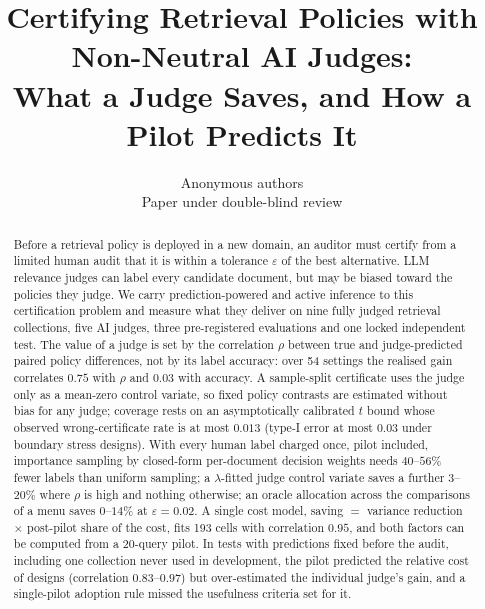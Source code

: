 \documentclass{article}
\title{Certifying Retrieval Policies with Non-Neutral AI Judges:\\ What a Judge Saves, and How a Pilot Predicts It}
\author{\name Anonymous authors \\ \addr Paper under double-blind review}
\newcommand{\eps}{\varepsilon}
\begin{document}
\maketitle

\begin{abstract}
Before a retrieval policy is deployed in a new domain, an auditor must certify from a limited human audit that it is within a tolerance $\eps$ of the best alternative. LLM relevance judges can label every candidate document, but may be biased toward the policies they judge. We carry prediction-powered and active inference to this certification problem and measure what they deliver on nine fully judged retrieval collections, five AI judges, three pre-registered evaluations and one locked independent test. The value of a judge is set by the correlation $\rho$ between true and judge-predicted paired policy differences, not by its label accuracy: over 54 settings the realised gain correlates $0.75$ with $\rho$ and $0.03$ with accuracy. A sample-split certificate uses the judge only as a mean-zero control variate, so fixed policy contrasts are estimated without bias for any judge; coverage rests on an asymptotically calibrated $t$ bound whose observed wrong-certificate rate is at most $0.013$ (type-I error at most $0.03$ under boundary stress designs). With every human label charged once, pilot included, importance sampling by closed-form per-document decision weights needs $40$--$56\%$ fewer labels than uniform sampling; a $\lambda$-fitted judge control variate saves a further $3$--$20\%$ where $\rho$ is high and nothing otherwise; an oracle allocation across the comparisons of a menu saves $0$--$14\%$ at $\eps=0.02$. A single cost model, saving $=$ variance reduction $\times$ post-pilot share of the cost, fits 193 cells with correlation $0.95$, and both factors can be computed from a 20-query pilot. In tests with predictions fixed before the audit, including one collection never used in development, the pilot predicted the relative cost of designs (correlation $0.83$--$0.97$) but over-estimated the individual judge's gain, and a single-pilot adoption rule missed the usefulness criteria set for it.
\end{abstract}
\end{document}
